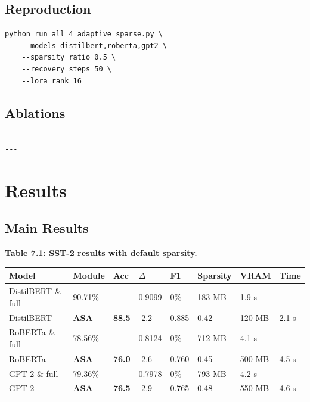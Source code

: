 \subsection{Reproduction}

\begin{lstlisting}
python run_all_4_adaptive_sparse.py \
    --models distilbert,roberta,gpt2 \
    --sparsity_ratio 0.5 \
    --recovery_steps 50 \
    --lora_rank 16
\end{lstlisting}

\subsection{Ablations}

\begin{lstlisting}

---
\end{lstlisting}


\section{Results}

\subsection{Main Results}

\textbf{Table 7.1: SST-2 results with default sparsity.}

\begin{table}[H]
\centering
\small
\begin{tabular}{llllllll}
\toprule
\textbf{Model} & \textbf{Module} & \textbf{Acc} & \textbf{$\Delta$} & \textbf{F1} & \textbf{Sparsity} & \textbf{VRAM} & \textbf{Time} \\
\midrule
DistilBERT \& full & 90.71\% & -- & 0.9099 & 0\% & 183 MB & 1.9 s \\
DistilBERT & \textbf{ASA} & \textbf{88.5} & -2.2 & 0.885 & 0.42 & 120 MB & 2.1 s \\
RoBERTa \& full & 78.56\% & -- & 0.8124 & 0\% & 712 MB & 4.1 s \\
RoBERTa & \textbf{ASA} & \textbf{76.0} & -2.6 & 0.760 & 0.45 & 500 MB & 4.5 s \\
GPT-2 \& full & 79.36\% & -- & 0.7978 & 0\% & 793 MB & 4.2 s \\
GPT-2 & \textbf{ASA} & \textbf{76.5} & -2.9 & 0.765 & 0.48 & 550 MB & 4.6 s \\
\bottomrule
\end{tabular}
\end{table}

